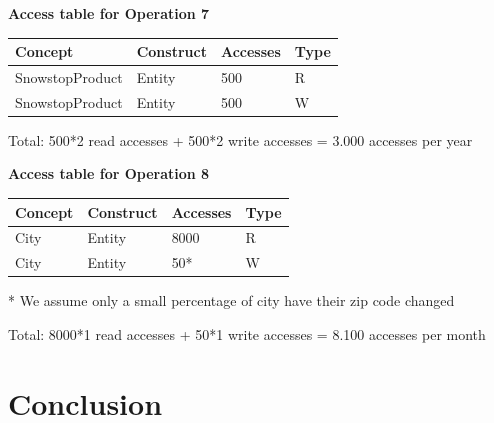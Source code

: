 \documentclass{article}[h]
\begin{document}
{{\vspace{12px}

{\centering \textbf{Access table for Operation 7}\\}
\begin{table}[H]
  \def\arraystretch{1.10}%
  \centering
  \begin{tabular}{ | m{4cm} | m{4cm}| m{3cm} | m{2cm} |} 
    \hline
    {\textbf{\large Concept}} & {\textbf{\large Construct}} & {\textbf{\large Accesses}} & {\textbf{\large Type}} \\
    \hline
    \color[HTML]{3531FF} SnowstopProduct & Entity & 500 & R \\ 
    \hline
    \color[HTML]{3531FF} SnowstopProduct & Entity & 500 & W \\ 
    \hline
  \end{tabular}
\end{table}
Total: 500*2 read accesses + 500*2 write accesses = 3.000 accesses per year

\vspace{12px}

{\centering \textbf{Access table for Operation 8}\\}
\begin{table}[H]
  \def\arraystretch{1.10}%
  \centering
  \begin{tabular}{ | m{4cm} | m{4cm}| m{3cm} | m{2cm} |} 
    \hline
    {\textbf{\large Concept}} & {\textbf{\large Construct}} & {\textbf{\large Accesses}} & {\textbf{\large Type}} \\
    \hline
    \color[HTML]{3531FF} City & Entity & 8000 & R \\ 
    \hline
    \color[HTML]{3531FF} City & Entity & 50* & W \\ 
    \hline
  \end{tabular}
  \small{* We assume only a small percentage of city have their zip code changed}
\end{table}
Total: 8000*1 read accesses + 50*1 write accesses = 8.100 accesses per month

\pagebreak

\vspace{12px}

\section{Conclusion}

}}
\end{document}
